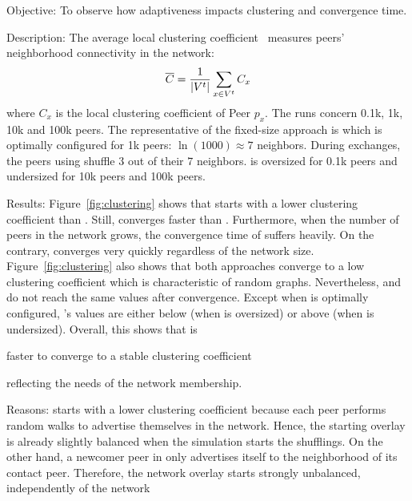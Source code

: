 \begin{asparadesc}
\item[Objective:] To observe how adaptiveness impacts clustering and convergence
  time.
\item[Description:] The average local clustering
  coefficient~\cite{watts1998collective} measures peers' neighborhood
  connectivity in the network:
  \begin{equation*}
    \overline{C} = {1\over |V^t|}\sum\limits_{x\in V^t}C_x
  \end{equation*}
  where $C_x$ is the local clustering coefficient of Peer $p_x$.  The
  runs concern 0.1k, 1k, 10k and 100k peers. The representative of the
  fixed-size approach is \CYCLON which is optimally configured for 1k
  peers: $\ln(1000)\approx 7$ neighbors. During exchanges, the peers
  using \CYCLON shuffle $3$ out of their $7$ neighbors. \CYCLON is
  oversized for 0.1k peers and undersized for 10k peers and 100k
  peers.
\item[Results:] Figure~\ref{fig:clustering} shows that \CYCLON starts
  with a lower clustering coefficient than \SPRAY. Still, \SPRAY
  converges faster than \CYCLON. Furthermore, when the number of peers
  in the network grows, the convergence time of \CYCLON suffers
  heavily. On the contrary, \SPRAY converges very quickly
  regardless of the network size. Figure~\ref{fig:clustering} also
  shows that both approaches converge to a low clustering coefficient
  which is characteristic of random graphs. Nevertheless, \CYCLON and
  \SPRAY do not reach the same values after convergence. Except when
  \CYCLON is optimally configured, \SPRAY's values are either below
  (when \CYCLON is oversized) or above (when \CYCLON is undersized).
  Overall, this shows that \SPRAY is
  \begin{inparaenum}
  \item faster to converge to a stable clustering coefficient
  \item reflecting the needs of the network membership.
  \end{inparaenum}
\item[Reasons:] \CYCLON starts with a lower clustering coefficient
  because each peer performs random walks to advertise themselves in
  the network. Hence, the starting overlay is already slightly
  balanced when the simulation starts the shufflings. On the other
  hand, a newcomer peer in \SPRAY only advertises itself to the
  neighborhood of its contact peer. Therefore, the network overlay
  starts strongly unbalanced, independently of the network

\end{asparadesc}
